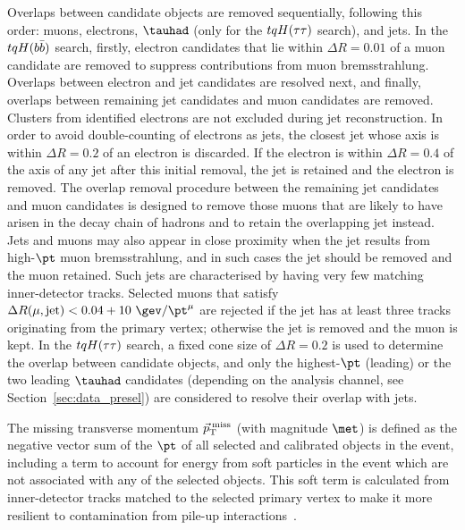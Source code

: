 Overlaps between candidate objects are removed sequentially, following this order: muons, electrons, $\tauhad$ (only for the $tqH(\tau\tau)$ search), and jets. 
In the $tqH(b\bar{b})$ search, firstly, electron candidates that lie within $\Delta R = 0.01$ of a muon 
candidate are removed to suppress contributions from muon bremsstrahlung.  Overlaps between electron and jet candidates are resolved 
next, and finally, overlaps between remaining jet candidates and muon candidates are removed.
Clusters from identified electrons are not excluded during jet reconstruction.
In order to avoid double-counting of electrons as jets, the closest jet whose axis is within ${\Delta}R = 0.2$ of an electron is discarded. If 
the electron is within ${\Delta}R = 0.4$ of the axis of any jet after this initial removal, the jet is retained and  the electron is removed.
The overlap removal procedure between the remaining jet candidates and muon candidates is designed to remove those muons 
that are likely to have arisen in the decay chain of hadrons and to retain the overlapping jet instead. 
Jets and muons may also appear in close proximity when the jet results from high-$\pt$ muon bremsstrahlung, 
and in such cases the jet should be removed and the muon retained. Such jets are characterised by having very 
few matching inner-detector tracks. Selected muons that satisfy $\Delta R(\mu,{\textrm{jet}}) < 0.04+10~\gev/\pt^\mu$ are rejected
if the jet has at least three tracks originating from the primary vertex; otherwise the jet is removed and the muon is kept.
In the $tqH(\tau\tau)$ search, a fixed cone size of $\Delta R = 0.2$ is used to determine the overlap between candidate objects, and only the
highest-$\pt$ (leading) or the two leading $\tauhad$ candidates (depending on the analysis channel, see Section~\ref{sec:data_presel}) are considered 
to resolve their overlap with jets. 

The missing transverse momentum $\vec{p}_\textrm{T}^\textrm{\;miss}$ (with magnitude $\met$) is defined as the negative vector sum of the 
$\pt$ of all selected and calibrated objects in the event, including a term to account for energy from soft particles 
in the event which are not associated with any of the selected objects. 
This soft term is calculated from inner-detector tracks matched to the selected primary vertex to make it more resilient to
contamination from pile-up interactions~\cite{run_2_met,ATL-PHYS-PUB-2015-027}.


